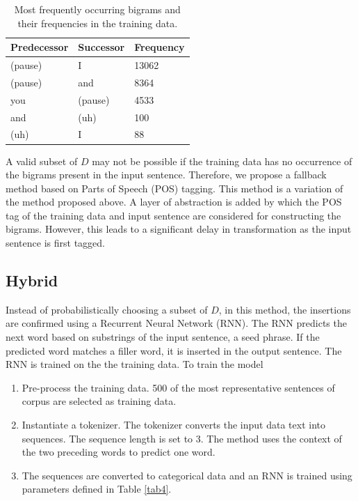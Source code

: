 \documentclass[journal]{IEEEtran}
\begin{document}
\begin{table}
\caption{Most frequently occurring bigrams and their frequencies in the training data.}
\label{tab1}
\small
\setlength{\tabcolsep}{3pt}
\begin{tabular}{|p{80pt}|p{80pt}|p{80pt}|}
\hline
Predecessor& 
Successor& 
Frequency \\
\hline
(pause) & I & 13062\\
(pause) & and & 8364\\
you & (pause) & 4533\\
and & (uh) & 100\\
(uh) & I & 88\\
\hline
\end{tabular}
\label{tab1}
\end{table}

A valid subset of $D$ may not be possible if the training data has no occurrence of the bigrams present in the input sentence. Therefore, we propose a fallback method based on Parts of Speech (POS) tagging. This method is a variation of the method proposed above. A layer of abstraction is added by which the POS tag\cite{pos} of the training data and input sentence are considered for constructing the bigrams. However, this leads to a significant delay in transformation as the input sentence is first tagged.

\subsection{Hybrid}

Instead of probabilistically choosing a subset of $D$, in this method, the insertions are confirmed using a Recurrent Neural Network (RNN). The RNN predicts the next word based on substrings of the input sentence, a seed phrase. If the predicted word matches a filler word, it is inserted in the output sentence. The RNN is trained on the the training data. To train the model

\begin{enumerate}
    \item Pre-process the training data. 500 of the most representative sentences of corpus are selected as training data.
    \item Instantiate a tokenizer. The tokenizer converts the input data text into sequences. The sequence length is set to 3. The method uses the context of the two preceding words to predict one word.  
    \item The sequences are converted to categorical data and an RNN is trained using parameters defined in Table \ref{tab4}.
\end{enumerate}
\end{document}
